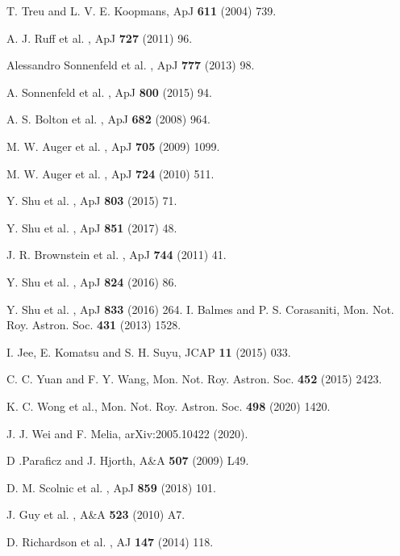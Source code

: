 \documentclass[12pt]{report}
\begin{document}
\begin{thebibliography}{99}
 T. Treu and L. V. E. Koopmans, ApJ \textbf{611} (2004) 739.

 A. J. Ruff et al. , ApJ \textbf{727} (2011) 96.

  Alessandro Sonnenfeld et al. ,  ApJ \textbf{777} (2013) 98.

 A. Sonnenfeld et al. ,  ApJ \textbf{800} (2015) 94.

 A. S. Bolton et al. ,  ApJ \textbf{682} (2008) 964.

 M. W. Auger et al. ,  ApJ \textbf{705} (2009) 1099.

 M. W. Auger et al. ,  ApJ \textbf{724} (2010) 511.
 
 Y. Shu et al. ,  ApJ \textbf{803} (2015) 71.

 Y. Shu et al. ,  ApJ \textbf{851} (2017) 48.

 J. R. Brownstein et al. ,  ApJ \textbf{744} (2011) 41.

 Y. Shu et al. ,  ApJ \textbf{824} (2016) 86.

 Y. Shu et al. ,  ApJ  \textbf{833} (2016) 264.
 I. Balmes and P. S. Corasaniti,   Mon. Not. Roy. Astron. Soc. \textbf{431} (2013) 1528.


 I. Jee, E. Komatsu and S. H. Suyu, JCAP \textbf{11} (2015) 033.

  C. C. Yuan and F. Y. Wang,  Mon. Not. Roy. Astron. Soc. \textbf{452} (2015) 2423.

 K. C. Wong et al.,  Mon. Not. Roy. Astron. Soc. \textbf{498} (2020) 1420.

 J. J. Wei and F. Melia, arXiv:2005.10422 (2020).

 D .Paraficz and J. Hjorth, A\&A \textbf{507} (2009) L49.

 D. M. Scolnic et al. ,  ApJ \textbf{859} (2018) 101.

 J. Guy et al. , A\&A \textbf{523} (2010) A7.

 D. Richardson et al. , AJ \textbf{147} (2014) 118.


\end{thebibliography}
\end{document}
